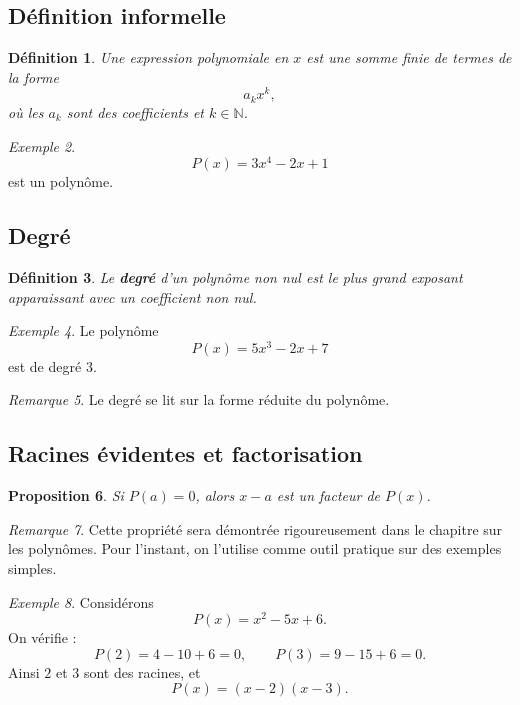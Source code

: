 \documentclass[11pt,a4paper]{article}
\newtheorem{definition}{Définition}[section]
\newtheorem{proposition}[definition]{Proposition}
\theoremstyle{remark}
\newtheorem{remarque}[definition]{Remarque}
\newtheorem{exemple}[definition]{Exemple}
\newcommand{\N}{\mathbb{N}}
\begin{document}
\subsection{Définition informelle}

\begin{definition}
Une expression polynomiale en \(x\) est une somme finie de termes de la forme
\[
a_k x^k,
\]
où les \(a_k\) sont des coefficients et \(k\in\N\).
\end{definition}

\begin{exemple}
\[
P(x)=3x^4-2x+1
\]
est un polynôme.
\end{exemple}

\subsection{Degré}

\begin{definition}
Le \textbf{degré} d’un polynôme non nul est le plus grand exposant apparaissant avec un coefficient non nul.
\end{definition}

\begin{exemple}
Le polynôme
\[
P(x)=5x^3-2x+7
\]
est de degré \(3\).
\end{exemple}

\begin{remarque}
Le degré se lit sur la forme réduite du polynôme.
\end{remarque}

\subsection{Racines évidentes et factorisation}

\begin{proposition}
Si \(P(a)=0\), alors \(x-a\) est un facteur de \(P(x)\).
\end{proposition}

\begin{remarque}
Cette propriété sera démontrée rigoureusement dans le chapitre sur les polynômes. Pour l’instant, on l’utilise comme outil pratique sur des exemples simples.
\end{remarque}

\begin{exemple}
Considérons
\[
P(x)=x^2-5x+6.
\]
On vérifie :
\[
P(2)=4-10+6=0,
\qquad
P(3)=9-15+6=0.
\]
Ainsi \(2\) et \(3\) sont des racines, et
\[
P(x)=(x-2)(x-3).
\]
\end{exemple}
\end{document}
